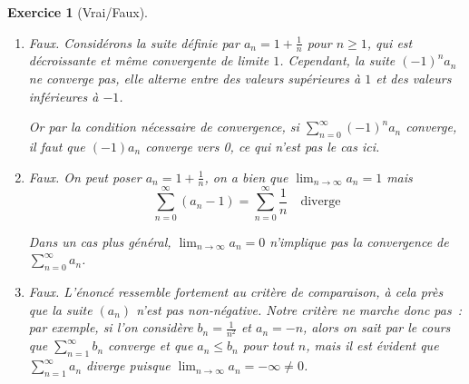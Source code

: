 \documentclass[11.5pt,french,table]{article}
\newcommand{\enumeratelinefix}{\leavevmode \vspace{-\baselineskip}} %
\theoremstyle{exercice}
\newtheorem{exercice}{Exercice}
\begin{document}
\begin{exercice}[Vrai/Faux]
\enumeratelinefix
\begin{enumerate}
    \item Faux. Considérons la suite définie par $a_n = 1 + \frac{1}{n}$ pour $n \geq 1$, qui est décroissante et même convergente de limite $1$. Cependant, la suite $(-1)^n a_n$ ne converge pas, elle alterne entre des valeurs supérieures à $1$ et des valeurs inférieures à $-1$.
    
    Or par la condition nécessaire de convergence, si $\displaystyle\sum_{n=0}^\infty (-1)^n a_n$ converge, il faut que $(-1)a_n$ converge vers 0, ce qui n'est pas le cas ici.
    
    \item Faux. On peut poser $a_n = 1 + \frac{1}{n}$, on a bien que $\displaystyle\lim_{n \to \infty} a_n = 1$ mais
    \[
    \sum_{n = 0}^{\infty} (a_n - 1) = \sum_{n=0}^{\infty} \frac{1}{n} \quad \textrm{diverge}
    \]
    
    Dans un cas plus général, $\displaystyle \lim_{n\to \infty} a_n = 0$ \emph{n'implique pas} la convergence de $\displaystyle \sum_{n=0}^{\infty} a_n$.
    
    \item Faux. L'énoncé ressemble fortement au critère de comparaison, à cela près que \emph{la suite $(a_n)$ n'est pas non-négative}. Notre critère ne marche donc pas~: par exemple, si l'on considère $b_n = \frac{1}{n^2}$ et $a_n = -n$, alors on sait par le cours que $\displaystyle\sum_{n = 1}^{\infty} b_n$ converge et que $a_n \leq b_n$ pour tout $n$, mais il est évident que $\displaystyle\sum_{n = 1}^{\infty} a_n$ diverge puisque $\displaystyle\lim_{n \to \infty} a_n = -\infty \neq 0$.
\end{enumerate}
\end{exercice}
\end{document}
